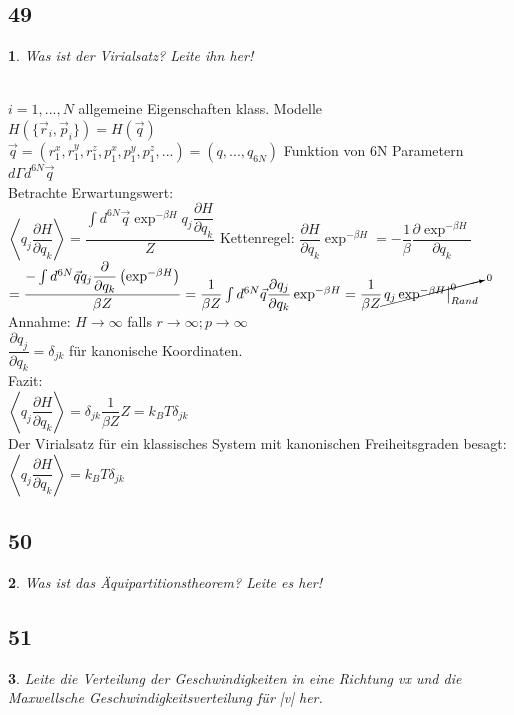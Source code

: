 \documentclass[12pt,a4paper]{report}
\newtheorem{myfrag}{}%
\begin{document}
\subsection{49}
\begin{myfrag}
Was ist der Virialsatz? Leite ihn her!
\end{myfrag} \quad \\
$i= 1,...,N $ \qquad allgemeine Eigenschaften klass. Modelle \\[1.5ex]
$H(\{\vec{r}_i,\vec{p}_i\})=H(\vec{q})$\\[1ex]
$\vec{q}=(r_1^x,r_1^y,r_1^z, p_1^x,p_1^y,p_1^z,...)=(q,...,q_{6N})$ Funktion von 6N Parametern $d\Gamma d^{6N}\vec{q}$ \\[1.5ex]
Betrachte Erwartungswert: \\[1.5ex]
$\left\langle q_j \dfrac{\partial H}{\partial q_k} \right\rangle = \dfrac{\int d^{6N} \vec{q} \exp ^{-\beta H} q_j \dfrac{\partial H}{\partial q_k}}{Z}$ \qquad Kettenregel: $\dfrac{\partial H}{\partial q_k} \exp ^{-\beta H} = -\dfrac{1}{\beta } \dfrac{\partial \exp ^{ -\beta H}}{\partial q_k}$ \\[1ex]
$= \dfrac{-\int d^{6N} \vec{q} q_j \dfrac{\partial}{\partial q_k}\left( \exp ^{-\beta H} \right)}{\beta Z} = \dfrac{1}{\beta Z} \int d^{6N} \vec{q} \dfrac{\partial q_j}{\partial q_k} \exp ^{-\beta H} = \dfrac{1}{\beta Z} \cancelto{0}{\left. q_j \exp^{-\beta H}\right| _{Rand} ^0} $ \\[1.5ex]
Annahme: $ H \rightarrow \infty $ falls $r\rightarrow \infty; p\rightarrow \infty$ \\[1ex]
$\dfrac{\partial q_j}{\partial q_k} = \delta_{jk}$ für kanonische Koordinaten. \\[1.5ex]
Fazit: \\[1.5ex]
$\left\langle q_j \dfrac{\partial H}{\partial q_k}\right\rangle = \delta_{jk} \dfrac{1}{\beta Z}Z = k_BT\delta_{jk}$ \\[1.5ex]
Der Virialsatz für ein klassisches System mit kanonischen Freiheitsgraden besagt:
\\[1.5ex]
$\left\langle q_j \dfrac{\partial H}{\partial q_k}\right\rangle = k_BT\delta_{jk}$
\subsection{50}
\begin{myfrag}
Was ist das Äquipartitionstheorem? Leite es her!
\end{myfrag}
\subsection{51}
\begin{myfrag}
Leite die Verteilung der Geschwindigkeiten in eine Richtung vx und die
Maxwellsche Geschwindigkeitsverteilung für |v| her.
\end{myfrag}
\end{document}
